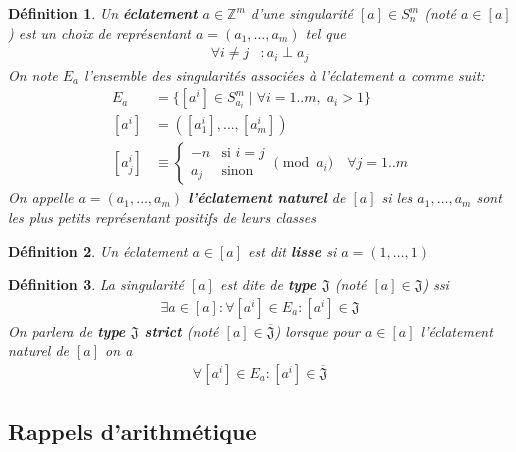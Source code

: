 \documentclass{article}
\newtheorem{definition}{Définition}
\begin{document}
\begin{definition}
    Un \textbf{éclatement} $a \in \mathbb{Z}^m$ d'une singularité $[a] \in S_n^m$ (noté $a \in [a]$) est un choix de 
    représentant $a = (a_1, \dots, a_m)$ tel que
    \begin{align*}
        \forall i \neq j & : a_i \perp a_j
    \end{align*}
    On note $E_a$ l'ensemble des singularités associées à l'éclatement $a$ comme suit:
    \begin{align*}
        E_a & = \{ [a^i] \in S_{a_i}^m \mid \forall i = 1..m,\; a_i > 1 \} \\
        [a^i] & = ([a^i_1], \dots, [a^i_m]) \\
        [a^i_j] & \equiv \begin{cases}
            -n & \text{si $i = j$} \\
            a_j & \text{sinon}
        \end{cases} \pmod{a_i} \quad \forall j = 1..m
    \end{align*}
    On appelle $a = (a_1, \dots, a_m)$ \textbf{l'éclatement naturel} de $[a]$ si 
    les $a_1, \dots, a_m$ sont les plus petits représentant positifs de leurs classes
\end{definition}

\begin{definition}
    Un éclatement $a \in [a]$ est dit \textbf{lisse} si $a = (1, \dots, 1)$
\end{definition}

\begin{definition}
    La singularité $[a]$ est dite de \textbf{type $\mathfrak{J}$} (noté $[a] \in \mathfrak{J}$) ssi
    \begin{align*}
        \exists a \in [a] : \forall [a^i] \in E_a : [a^i] \in \mathfrak{J}
    \end{align*}
    On parlera de \textbf{type $\mathfrak{J}$ strict} (noté $[a] \in \overline{\mathfrak{J}}$) lorsque 
    pour $a \in [a]$ l'éclatement naturel de $[a]$ on a
    \begin{align*}
        \forall [a^i] \in E_a : [a^i] \in \overline{\mathfrak{J}}
    \end{align*}
\end{definition}

\newpage

\subsection{Rappels d'arithmétique}
\end{document}
